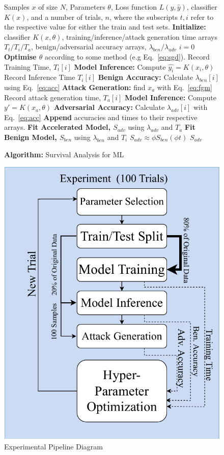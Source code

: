 \documentclass[conference]{IEEEtran}
\begin{document}
\begin{figure}[h!]
    \caption{\textbf{Algorithm: }Survival Analysis for ML}
    \label{fig:alg}
\begin{algorithmic}
    \Require Samples $x $ of size $N$, Parameters $\theta$, Loss function $L(y, \hat{y})$, classifier $K(x)$, and a number of trials, $n$, where the subscripts $t,i$ refer to the respective value for either the train and test sets.
    \State \textbf{Initialize:} classifier $K(x, \theta)$, training/inference/attack generation time arrays $T_t/T_i/T_a$, benign/adversarial accuracy arrays, $\lambda_{ben}/ \lambda_{adv}$
    \State $i = 0$
    \State \textbf{Optimise $\theta$} according to some method (e.g Eq.~\ref{eq:sgd}).
    \State Record Training Time, $ T_t[i] $
    \State \textbf{Model Inference:} Compute $ \hat{y_i} = K(x_i, \theta) $
    \State Record Inference Time $ T_i[i] $
    \State \textbf{Benign Accuracy:} Calculate $\lambda_{ben}[i]$ using Eq.~\ref{eq:acc}
    \State \textbf{Attack Generation: } find $x_a$ with Eq.~\ref{eq:fgm}
    \State Record attack generation time, $T_a[i]$
    \State \textbf{Model Inference:} Compute $ y' = K(x_a, \theta) $
    \State \textbf{Adversarial Accuracy:} Calculate $\lambda_{adv}[i]$ with Eq.~\ref{eq:acc}
    \State \textbf{Append} accuracies and times to their respective arrays.
    \EndWhile
    \State \textbf{Fit Accelerated Model, $S_{adv}$} using $\lambda_{adv}$ and $T_a$
    \State \textbf{Fit Benign Model, $S_{ben}$} using $\lambda_{ben}$ and $T_i$
    \Ensure$ S_{adv} \approx  \phi S_{ben}(\phi t)$
    \Return $S_{adv}$
\end{algorithmic}
\end{figure}


\begin{figure}
    \centering
    \includegraphics[width=.35\textwidth]{plots/experiment.pdf}
    \caption{Experimental Pipeline Diagram}
    \label{fig:experiments}
\end{figure}
\end{document}
